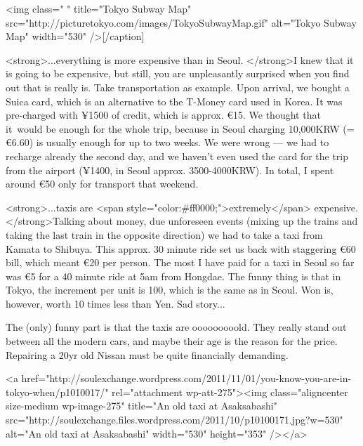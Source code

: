 \begin{post}
\begin{content}
[caption id="" align="aligncenter" width="530" caption="Tokyo Subway Map (i.e. without JR commuter trains) (source: http://picturetokyo.com)"]<img class=" " title="Tokyo Subway Map" src="http://picturetokyo.com/images/TokyoSubwayMap.gif" alt="Tokyo Subway Map" width="530" />[/caption]



<strong>...everything is more expensive than in Seoul. </strong>I knew that it is going to be expensive, but still, you are unpleasantly surprised when you find out that is really is. Take transportation as example. Upon arrival, we bought a Suica card, which is an alternative to the T-Money card used in Korea. It was pre-charged with ¥1500 of credit, which is approx. €15. We thought that it would be enough for the whole trip, because in Seoul charging 10,000KRW (= €6.60) is usually enough for up to two weeks. We were wrong — we had to recharge already the second day, and we haven't even used the card for the trip from the airport (¥1400, in Seoul approx. 3500-4000KRW). In total, I spent around €50 only for transport that weekend.



<strong>...taxis are <span style="color:#ff0000;">extremely</span> expensive. </strong>Talking about money, due unforeseen events (mixing up the trains and taking the last train in the opposite direction) we had to take a taxi from Kamata to Shibuya. This approx. 30 minute ride set us back with staggering €60 bill, which meant €20 per person. The most I have paid for a taxi in Seoul so far was €5 for a 40 minute ride at 5am from Hongdae. The funny thing is that in Tokyo, the increment per unit is 100, which is the same as in Seoul. Won is, however, worth 10 times less than Yen. Sad story...



The (only) funny part is that the taxis are ooooooooold. They really stand out between all the modern cars, and maybe their age is the reason for the price. Repairing a 20yr old Nissan must be quite financially demanding.



<a href="http://soulexchange.wordpress.com/2011/11/01/you-know-you-are-in-tokyo-when/p1010017/" rel="attachment wp-att-275"><img class="aligncenter size-medium wp-image-275" title="An old taxi at Asaksabashi" src="http://soulexchange.files.wordpress.com/2011/10/p10100171.jpg?w=530" alt="An old taxi at Asaksabashi" width="530" height="353" /></a>




\end{content}
\end{post}
